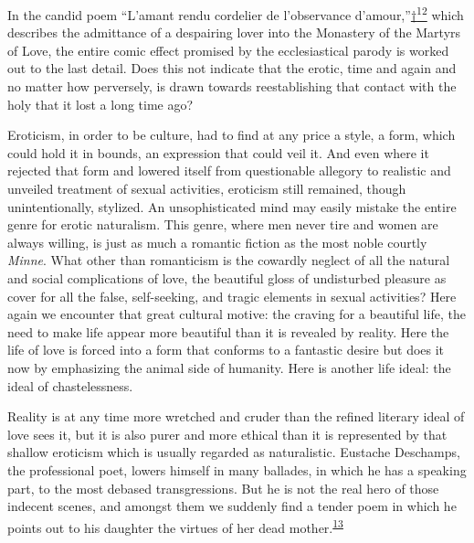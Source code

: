 In the candid poem ``L'amant rendu cordelier de l'observance
d'amour,''\protect\hypertarget{11_Chapter_Four__THE_FORMS_OF_LOVE.xhtmlux5cux23id_3123}{\protect\hyperlink{23_NOTES.xhtmlux5cux23id_3124}{†\textsuperscript{12}}}
which describes the admittance of a despairing lover into the Monastery
of the Martyrs of Love, the entire comic effect promised by the
ecclesiastical parody is worked out to the last detail. Does this not
indicate that the erotic, time and again and no matter how perversely,
is drawn towards reestablishing that contact with the holy that it lost
a long time ago?

Eroticism, in order to be culture, had to find at any price a style, a
form, which could hold it in bounds, an expression that could veil it.
And even where it rejected that form and lowered itself from
questionable allegory to realistic and unveiled treatment of sexual
activities, eroticism still remained, though unintentionally, stylized.
An unsophisticated mind may easily mistake the entire genre for erotic
naturalism. This genre, where men never tire and women are always
willing, is just as much a romantic fiction as the most noble courtly
\emph{Minne}. What other than romanticism is the cowardly neglect of all
the natural and social complications of love, the beautiful gloss of
undisturbed pleasure as cover for all the false, self-seeking, and
tragic elements in sexual activities? Here again we encounter that great
cultural motive: the craving for a beautiful life, the need to make life
appear more beautiful than it is revealed by reality. Here the life of
love is forced into a form that conforms to a fantastic desire but does
it now by emphasizing the animal side of humanity. Here is another life
ideal: the ideal of chastelessness.

\protect\hypertarget{11_Chapter_Four__THE_FORMS_OF_LOVE.xhtmlux5cux23page_133}{}{}Reality
is at any time more wretched and cruder than the refined literary ideal
of love sees it, but it is also purer and more ethical than it is
represented by that shallow eroticism which is usually regarded as
naturalistic. Eustache Deschamps, the professional poet, lowers himself
in many ballades, in which he has a speaking part, to the most debased
transgressions. But he is not the real hero of those indecent scenes,
and amongst them we suddenly find a tender poem in which he points out
to his daughter the virtues of her dead
mother.\textsuperscript{\protect\hypertarget{11_Chapter_Four__THE_FORMS_OF_LOVE.xhtmlux5cux23id_1462}{\protect\hyperlink{23_NOTES.xhtmlux5cux23id_1463}{13}}}


